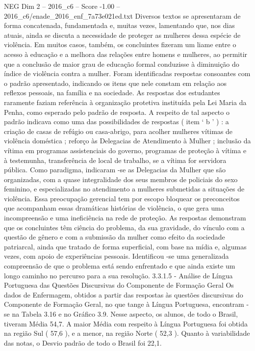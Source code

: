 \begin{textsample}{NEG Dim 2 – 2016\_c6 – Score -1.00 – 2016\_c6/enade\_2016\_enf\_7a73e021ed.txt}
Diversos textos se apresentaram de forma concatenada, fundamentada e, muitas vezes, lamentando que, nos dias atuais, ainda se discuta a necessidade de proteger as mulheres dessa espécie de violência.
Em muitos casos, também, os concluintes fizeram um liame entre o acesso à educação e a melhora das relações entre homens e mulheres, ao permitir que a conclusão de maior grau de educação formal conduzisse à diminuição do índice de violência contra a mulher.
Foram identificadas respostas consoantes com o padrão apresentado, indicando os itens que nele constam em relação aos reflexos pessoais, na família e na sociedade.
As respostas dos estudantes raramente faziam referência à organização protetiva instituída pela Lei Maria da Penha, como esperado pelo padrão de resposta.
A respeito de tal aspecto o padrão indicava como uma das possibilidades de respostas ( item ‘ b ’ ) : a criação de casas de refúgio ou casa-abrigo, para acolher mulheres vítimas de violência doméstica ; reforço às Delegacias de Atendimento à Mulher ; inclusão da vítima em programas assistenciais do governo, programas de proteção à vítima e à testemunha, transferência de local de trabalho, se a vítima for servidora pública.
Como paradigma, indicaram -se as Delegacias da Mulher que são organizadas, com a quase integralidade dos seus membros de policiais do sexo feminino, e especializadas no atendimento a mulheres submetidas a situações de violência.
Essa preocupação gerencial tem por escopo bloquear os preconceitos que acompanham essas dramáticas histórias de violência, o que gera uma incompreensão e uma ineficiência na rede de proteção.
As respostas demonstram que os concluintes têm ciência do problema, da sua gravidade, do vínculo com a questão de gênero e com a submissão da mulher como efeito da sociedade patriarcal, ainda que tratado de forma superficial, com base na mídia e, algumas vezes, com apoio de experiências pessoais.
Identificou -se uma generalizada compreensão de que o problema está sendo enfrentado e que ainda existe um longo caminho no percurso para a sua resolução. 3.3.1.5 - Análise de Língua Portuguesa das Questões Discursivas do Componente de Formação Geral Os dados de Enfermagem, obtidos a partir das respostas às questões discursivas do Componente de Formação Geral, no que tange à Língua Portuguesa, encontram -se na Tabela 3.16 e no Gráfico 3.9.
Nesse aspecto, os alunos, de todo o Brasil, tiveram Média 54,7.
A maior Média com respeito à Língua Portuguesa foi obtida na região Sul ( 57,6 ), e a menor, na região Norte ( 52,3 ).
Quanto à variabilidade das notas, o Desvio padrão de todo o Brasil foi 22,1.

\end{textsample}
